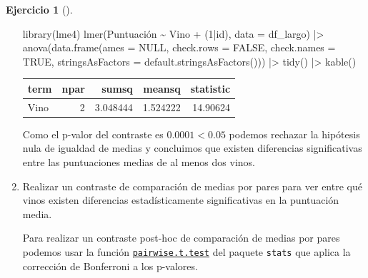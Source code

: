 \documentclass[
  a4paper,
]{scrreport}
\newenvironment{Shaded}{\begin{snugshade}}{\end{snugshade}}
\newcommand{\AttributeTok}[1]{\textcolor[rgb]{0.40,0.45,0.13}{#1}}
\newcommand{\ConstantTok}[1]{\textcolor[rgb]{0.56,0.35,0.01}{#1}}
\newcommand{\DecValTok}[1]{\textcolor[rgb]{0.68,0.00,0.00}{#1}}
\newcommand{\FunctionTok}[1]{\textcolor[rgb]{0.28,0.35,0.67}{#1}}
\newcommand{\NormalTok}[1]{\textcolor[rgb]{0.00,0.23,0.31}{#1}}
\newcommand{\SpecialCharTok}[1]{\textcolor[rgb]{0.37,0.37,0.37}{#1}}
\theoremstyle{definition}
\newtheorem{exercise}{Ejercicio}[chapter]
\theoremstyle{remark}
\begin{document}
\begin{exercise}[]
\begin{enumerate}
\begin{tcolorbox}
\begin{Shaded}
\begin{Highlighting}[]
\FunctionTok{library}\NormalTok{(lme4)}
\FunctionTok{lmer}\NormalTok{(Puntuación }\SpecialCharTok{\textasciitilde{}}\NormalTok{ Vino }\SpecialCharTok{+}\NormalTok{ (}\DecValTok{1}\SpecialCharTok{|}\NormalTok{id), }\AttributeTok{data =}\NormalTok{ df\_largo) }\SpecialCharTok{|\textgreater{}} 
\FunctionTok{anova}\NormalTok{(}\FunctionTok{data.frame}\NormalTok{(}\AttributeTok{ames =} \ConstantTok{NULL}\NormalTok{, }\AttributeTok{check.rows =} \ConstantTok{FALSE}\NormalTok{, }\AttributeTok{check.names =} \ConstantTok{TRUE}\NormalTok{, }\AttributeTok{stringsAsFactors =} \FunctionTok{default.stringsAsFactors}\NormalTok{())) }\SpecialCharTok{|\textgreater{}}
    \FunctionTok{tidy}\NormalTok{() }\SpecialCharTok{|\textgreater{}} 
    \FunctionTok{kable}\NormalTok{()}
\end{Highlighting}
\end{Shaded}

  \begin{longtable}[]{@{}lrrrr@{}}
  \toprule\noalign{}
  term & npar & sumsq & meansq & statistic \\
  \midrule\noalign{}
  \endhead
  \bottomrule\noalign{}
  \endlastfoot
  Vino & 2 & 3.048444 & 1.524222 & 14.90624 \\
  \end{longtable}

  Como el p-valor del contraste es \(0.0001 < 0.05\) podemos rechazar la
  hipótesis nula de igualdad de medias y concluimos que existen
  diferencias significativas entre las puntuaciones medias de al menos
  dos vinos.

  \end{tcolorbox}
\item
  Realizar un contraste de comparación de medias por pares para ver
  entre qué vinos existen diferencias estadísticamente significativas en
  la puntuación media.

  \begin{tcolorbox}[enhanced jigsaw, colframe=quarto-callout-note-color-frame, toprule=.15mm, bottomtitle=1mm, breakable, opacitybacktitle=0.6, toptitle=1mm, colback=white, bottomrule=.15mm, title=\textcolor{quarto-callout-note-color}{\faInfo}\hspace{0.5em}{Ayuda}, arc=.35mm, left=2mm, titlerule=0mm, rightrule=.15mm, coltitle=black, leftrule=.75mm, opacityback=0, colbacktitle=quarto-callout-note-color!10!white]

  Para realizar un contraste post-hoc de comparación de medias por pares
  podemos usar la función
  \href{https://rdrr.io/r/stats/pairwise.t.test.html}{\texttt{pairwise.t.test}}
  del paquete \texttt{stats} que aplica la corrección de Bonferroni a
  los p-valores.


\end{tcolorbox}
\end{enumerate}
\end{exercise}
\end{document}
